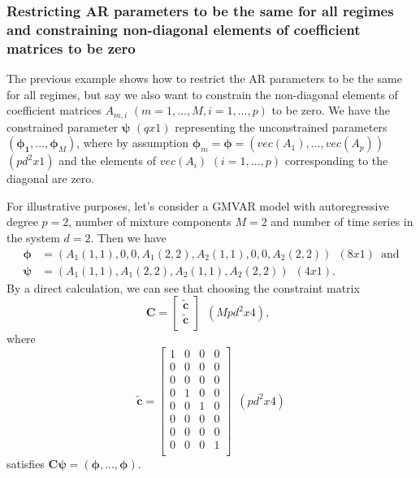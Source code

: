 \documentclass[nojss]{jss} %
\begin{document}
\subsubsection{Restricting AR parameters to be the same for all regimes and constraining non-diagonal elements of coefficient matrices to be zero}
The previous example shows how to restrict the AR parameters to be the same for all regimes, but say we also want to constrain the non-diagonal elements of coefficient matrices $A_{m,i}$ $(m=1,...,M, i=1,...,p)$ to be zero. We have the constrained parameter $\boldsymbol{\psi}$ $(qx1)$ representing the unconstrained parameters $(\boldsymbol{\phi_1},...,\boldsymbol{\phi}_M)$, where by assumption $\boldsymbol{\phi}_m=\boldsymbol{\phi}=(vec(A_1),...,vec(A_p))$ $(pd^2x1)$ and the elements of $vec(A_i)$ $(i=1,...,p)$ corresponding to the diagonal are zero.

For illustrative purposes, let's consider a GMVAR model with autoregressive degree $p=2$, number of mixture components $M=2$ and number of time series in the system $d=2$. Then we have
\begin{align}
\boldsymbol{\phi}&=(A_1(1,1),0,0,A_1(2,2),A_2(1,1),0,0,A_2(2,2)) \enspace (8x1) \enspace \text{and}\\
\boldsymbol{\psi}&=(A_1(1,1),A_1(2,2),A_2(1,1),A_2(2,2)) \enspace (4x1).
\end{align}
By a direct calculation, we can see that choosing the constraint matrix
\begin{equation}
\boldsymbol{C}=\left[{\begin{array}{c}
   \boldsymbol{\tilde{c}} \\
   \boldsymbol{\tilde{c}} \\
  \end{array}}\right]
\enspace (Mpd^2x4),
\enspace
\end{equation}
where
\begin{equation}
\boldsymbol{\tilde{c}}=\left[{\begin{array}{cccc}
   1 & 0 & 0 & 0 \\
   0 & 0 & 0 & 0 \\
   0 & 0 & 0 & 0 \\
   0 & 1 & 0 & 0 \\
   0 & 0 & 1 & 0 \\
   0 & 0 & 0 & 0 \\
   0 & 0 & 0 & 0 \\
   0 & 0 & 0 & 1 \\
  \end{array}}\right]
\enspace (pd^2x4)
\end{equation}
satisfies $\boldsymbol{C}\boldsymbol{\psi}=(\boldsymbol{\phi},...,\boldsymbol{\phi}).$
\end{document}
